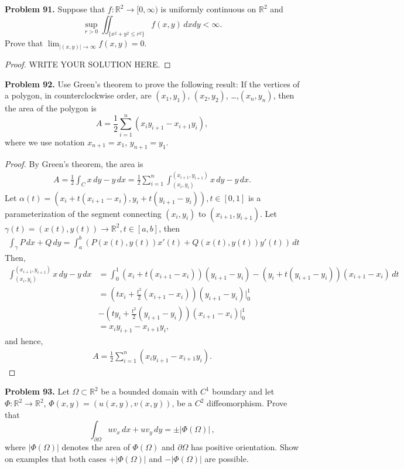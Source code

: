 \documentclass[11pt]{article}
\theoremstyle{definition}
\theoremstyle{definition}
\begin{document}
\medskip


\noindent
{\bf Problem 91.}
Suppose that $f:\mathbb{R}^2\to [0,\infty)$ is uniformly continuous on $\mathbb{R}^2$ and
$$
\sup_{r>0} \iint_{\{x^2+y^2\leq r^2\}} f(x,y)\, dxdy <\infty.
$$
Prove that $\displaystyle \lim_{|(x,y)|\to\infty} f(x,y)=0$.
\begin{proof}
	WRITE YOUR SOLUTION HERE.
\end{proof}


\medskip

\noindent
{\bf Problem 92.}
Use Green's theorem to prove the following result:
If the vertices of a polygon, in counterclockwise order, are
$(x_1,y_1)$, $(x_2,y_2)$, \ldots,$(x_n,y_n)$, then the area of the
polygon is
$$
A=\frac{1}{2}
\sum_{i=1}^n(x_iy_{i+1}-x_{i+1}y_i),
$$
where we use notation $x_{n+1}=x_1$, $y_{n+1}=y_1$.
\begin{proof}
By Green's theorem, the area is
\begin{align*}
    A = \frac{1}{2} \int_C x\, dy - y\, dx = \frac{1}{2} \sum^n_{i=1} \int^{(x_{i+1}, y_{i+1})}_{(x_{i}, y_{i})} x\, dy - y\, dx.
\end{align*}
Let $\alpha(t) = \left(x_i + t(x_{i+1} - x_{i}), y_i + t(y_{i+1} - y_{i}) \right), t\in [0,1]$ is a parameterization of the segment connecting $(x_{i}, y_{i})$ to $(x_{i+1}, y_{i+1})$. Let $\gamma(t) = (x(t), y(t)) \to \mathbb{R}^2, t \in [a,b]$, then 
\begin{align*}
    \int_\gamma P\, dx + Q\, dy = \int^b_a \left(P(x(t),y(t))x'(t) + Q(x(t),y(t))y'(t) \right)\, dt
\end{align*}
Then,
\begin{align*}
    \int^{(x_{i+1}, y_{i+1})}_{(x_{i}, y_{i})} x\, dy - y\, dx & = \int^1_0 (x_i + t(x_{i+1} - x_{i}))(y_{i+1} - y_i) - (y_i + t(y_{i+1} - y_{i}))(x_{i+1} - x_i)\, dt \\
    & = \left(tx_i + \frac{t^2}{2}(x_{i+1} - x_i)\right) (y_{i+1} - y_i)\Bigg|^1_0 \\
    & - \left(ty_i + \frac{t^2}{2} (y_{i+1} - y_i)\right) (x_{i+1} - x_i)\Bigg|^1_0 \\
    & = x_i y_{i+1} - x_{i+1} y_i,
\end{align*}
and hence,
\begin{align*}
    A = \frac{1}{2} \sum_{i=1}^n (x_i y_{i+1} - x_{i+1} y_i).
\end{align*}
\end{proof}


\medskip

\noindent
{\bf Problem 93.}
Let $\Omega\subset\mathbb{R}^2$ be a bounded
domain with $C^1$ boundary and let $\Phi:\mathbb{R}^2\to\mathbb{R}^2$,
$\Phi(x,y)=(u(x,y), v(x,y))$,
be a
$C^2$ diffeomorphism. Prove that
$$
\int_{\partial\Omega} uv_x\, dx + uv_y\, dy = \pm|\Phi(\Omega)|\, ,
$$
where $|\Phi(\Omega)|$ denotes the area of $\Phi(\Omega)$
and $\partial\Omega$ has positive orientation.
Show on examples that both cases $+|\Phi(\Omega)|$ and
$-|\Phi(\Omega)|$ are possible.
\end{document}
